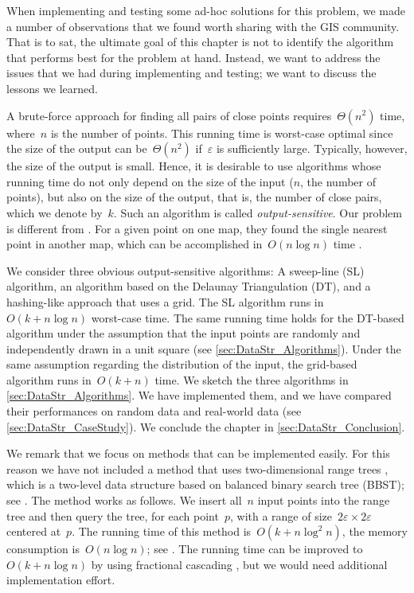 When implementing and testing some ad-hoc solutions 
for this problem, 
we made a number of observations 
that we found worth sharing with the GIS community. 
That is to sat, the ultimate goal of this chapter 
is not to identify the algorithm 
that performs best for the problem at hand. 
Instead, we want to address the issues 
that we had during implementing and testing; 
we want to discuss the lessons we learned.


A brute-force approach for finding all pairs of close points 
requires~$\Theta (n^{2})$ time, 
where~$n$ is the number of points. 
This running time is worst-case optimal 
since the size of the output can be~$\Theta (n^{2})$ 
if~$\varepsilon$ is sufficiently large. 
Typically, however, the size of the output is small. 
Hence, it is desirable to use algorithms 
whose running time do not only depend on 
the size of the input ($n$, the number of points), 
but also on the size of the output, that is, 
the number of close pairs, 
which we denote by~$k$. 
Such an algorithm is called \emph{output-sensitive}. 
Our problem is different from \textcite{Saalfeld1988}. 
For a given point on one map, they found the 
single nearest point in another map,
which can be accomplished in~$O(n\log n)$ time 
\parencite{Shamos1975}.

We consider three obvious output-sensitive algorithms: 
A sweep-line (SL) algorithm, 
an algorithm based on the Delaunay Triangulation (DT), and 
a hashing-like approach that uses a grid. 
The SL algorithm runs in~$O(k+n\log n)$ worst-case time.
The same running time holds for the DT-based algorithm 
under the assumption that 
the input points are randomly and independently drawn 
in a unit square (see \sect\ref{sec:DataStr_Algorithms}). 
Under the same assumption 
regarding the distribution of the input, 
the grid-based algorithm runs in~$O(k+n)$ time. 
We sketch the three algorithms in 
\sect\ref{sec:DataStr_Algorithms}. 
We have implemented them, and 
we have compared their performances on random data 
and real-world data (see \sect\ref{sec:DataStr_CaseStudy}). 
We conclude the chapter in \sect\ref{sec:DataStr_Conclusion}.



We remark that we focus on methods 
that can be implemented easily.
For this reason we have not included a method that uses 
two-dimensional range trees
\parencite{Bentley1977Multivariate,Lueker1978,Lee1980Tree}, 
which is a two-level data structure based on
balanced binary search tree (BBST);
see \textcite[]{Cormen2009}.
The method works as follows. 
We insert all~$n$ input points into the range tree 
and then query the tree, for each point~$p$, 
with a range of size~$2\varepsilon \times 2\varepsilon$ 
centered at~$p$.
The running time of this method is~$O(k+n\log ^{2}n)$, the 
memory consumption is~$O(n\log n)$;
see \textcite{Bentley1977Multivariate,}. 
The running time can be improved to~$O(k+n\log n)$ 
by using fractional cascading
\parencite[]{deBerg2008}, 
but we would need additional implementation effort.





